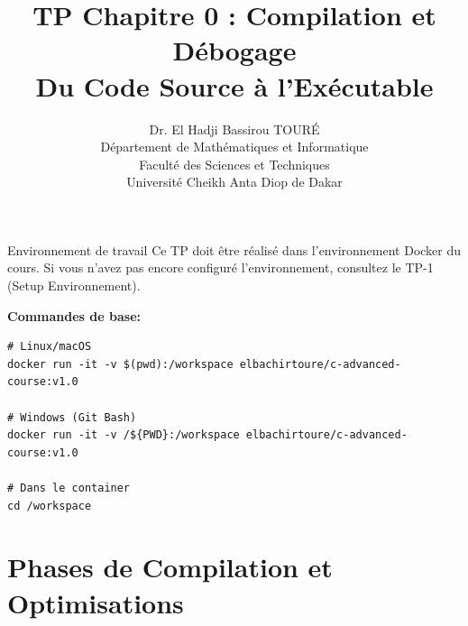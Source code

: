 \documentclass[10pt,a4paper]{article}
\title{\textbf{TP Chapitre 0 : Compilation et Débogage}\\
\large Du Code Source à l'Exécutable}
\author{Dr. El Hadji Bassirou TOURÉ\\
Département de Mathématiques et Informatique\\
Faculté des Sciences et Techniques\\
Université Cheikh Anta Diop de Dakar}
\date{}
\begin{document}
\maketitle

\begin{infobox}{Environnement de travail}
Ce TP doit être réalisé dans l'environnement Docker du cours. 
Si vous n'avez pas encore configuré l'environnement, consultez le TP-1 (Setup Environnement).

\textbf{Commandes de base:}
\begin{verbatim}
# Linux/macOS
docker run -it -v $(pwd):/workspace elbachirtoure/c-advanced-course:v1.0

# Windows (Git Bash)
docker run -it -v /${PWD}:/workspace elbachirtoure/c-advanced-course:v1.0

# Dans le container
cd /workspace
\end{verbatim}
\end{infobox}

\section{Phases de Compilation et Optimisations}
\end{document}
